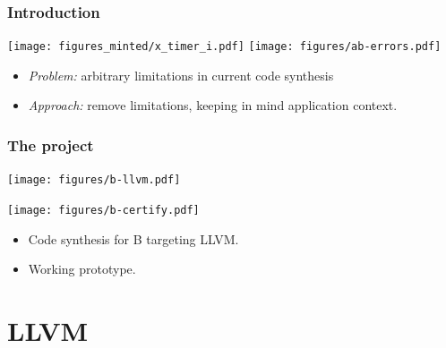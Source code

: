 \documentclass[12pt]{beamer}
\begin{document}
\begin{frame}

  \frametitle{Introduction}
	
\begin{center}
  \texttt{[image: figures\_minted/x\_timer\_i.pdf]}
\vspace*{2mm}
  \texttt{[image: figures/ab-errors.pdf]}
\end{center}

\begin{itemize}
\item \emph{Problem:\/} arbitrary limitations in current code synthesis
\item \emph{Approach:\/} remove limitations, keeping in mind application
  context.
\end{itemize}
\end{frame}

\begin{frame}

  \frametitle{The \bllvm project}
	
\begin{minipage}{.34\textwidth}
  \texttt{[image: figures/b-llvm.pdf]}
\end{minipage}
\begin{minipage}{.56\textwidth}
  \texttt{[image: figures/b-certify.pdf]}
\end{minipage}

  \begin{itemize}
  \item Code synthesis for B targeting LLVM.
  \item Working prototype.
  \end{itemize}

\end{frame}

\section{LLVM}
\end{document}
